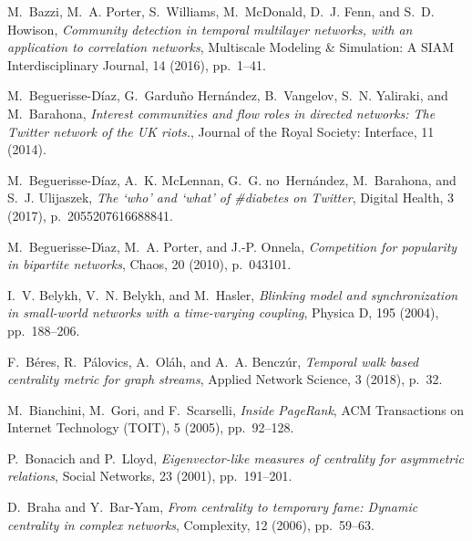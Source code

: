 \documentclass[journal,transmag]{IEEEtran}
\begin{document}




%
%


\begin{thebibliography}{10}

{\sc M.~Bazzi, M.~A. Porter, S.~Williams, M.~McDonald, D.~J. Fenn, and S.~D.
  Howison}, {\em Community detection in temporal multilayer networks, with an
  application to correlation networks}, Multiscale Modeling \& Simulation: A
  SIAM Interdisciplinary Journal, 14 (2016), pp.~1--41.

{\sc M.~Beguerisse-D\'{i}az, G.~Gardu\~no Hern\'{a}ndez, B.~Vangelov, S.~N.
  Yaliraki, and M.~Barahona}, {\em Interest communities and flow roles in
  directed networks: {T}he {T}witter network of the {UK} riots.}, Journal of
  the Royal Society: Interface, 11 (2014).

{\sc M.~Beguerisse-D\'iaz, A.~K. McLennan, G.~G. no~Hern\'{a}ndez, M.~Barahona,
  and S.~J. Ulijaszek}, {\em The `who' and `what' of \#diabetes on {T}witter},
  Digital Health, 3 (2017), p.~2055207616688841.

{\sc M.~Beguerisse-D{\'\i}az, M.~A. Porter, and J.-P. Onnela}, {\em Competition
  for popularity in bipartite networks}, Chaos, 20 (2010), p.~043101.

{\sc I.~V. Belykh, V.~N. Belykh, and M.~Hasler}, {\em Blinking model and
  synchronization in small-world networks with a time-varying coupling},
  Physica D, 195 (2004), pp.~188--206.

{\sc F.~B{\'e}res, R.~P{\'a}lovics, A.~Ol{\'a}h, and A.~A. Bencz{\'u}r}, {\em
  Temporal walk based centrality metric for graph streams}, Applied Network
  Science, 3 (2018), p.~32.

{\sc M.~Bianchini, M.~Gori, and F.~Scarselli}, {\em {Inside PageRank}}, ACM
  Transactions on Internet Technology (TOIT), 5 (2005), pp.~92--128.

{\sc P.~Bonacich and P.~Lloyd}, {\em Eigenvector-like measures of centrality
  for asymmetric relations}, Social Networks, 23 (2001), pp.~191--201.

{\sc D.~Braha and Y.~Bar-Yam}, {\em From centrality to temporary fame: Dynamic
  centrality in complex networks}, Complexity, 12 (2006), pp.~59--63.


\end{thebibliography}
\end{document}
